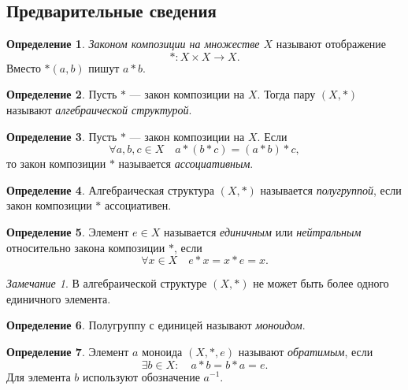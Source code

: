 \documentclass{article}
\theoremstyle{definition}
\newtheorem{definition}{Определение}[section]
\theoremstyle{plain}
\theoremstyle{remark}
\newtheorem{remark}{Замечание}[section]
\numberwithin{equation}{section}
\begin{document}
\subsection{Предварительные сведения}

\begin{definition}
  \textit{Законом композиции на множестве $X$} называют отображение
  \begin{equation*}
    * : X \times X \to X.
  \end{equation*}
  Вместо $*(a,b)$ пишут $a * b$.
\end{definition}

\begin{definition}
  Пусть $*$ --- закон композиции на $X$. Тогда пару $(X, *)$ называют
  \textit{алгебраической структурой}.
\end{definition}

\begin{definition}
  Пусть $*$ --- закон композиции на $X$. Если
  \begin{equation*}
    \forall a,b,c \in X \quad a * (b * c) = (a * b) * c,
  \end{equation*}
  то закон композиции $*$ называется \textit{ассоциативным}.
\end{definition}

\begin{definition}
  Алгебраическая структура $(X, *)$ называется \textit{полугруппой}, если закон
  композиции $*$ ассоциативен.
\end{definition}

\begin{definition}
  Элемент $e \in X$ называется \textit{единичным} или \textit{нейтральным}
  относительно закона композиции $*$, если
  \begin{equation*}
    \forall x \in X \quad e * x = x * e = x.
  \end{equation*}
\end{definition}

\begin{remark}
  В алгебраической структуре $(X, *)$ не может быть более одного единичного
  элемента.
\end{remark}

\begin{definition}
  Полугруппу с единицей называют \textit{моноидом}.
\end{definition}

\begin{definition}
  Элемент $a$ моноида $(X, *, e)$ называют \textit{обратимым}, если
  \begin{equation*}
    \exists b \in X: \quad a * b = b * a = e.
  \end{equation*}
  Для элемента $b$ используют обозначение $a^{-1}$.
\end{definition}
\end{document}
